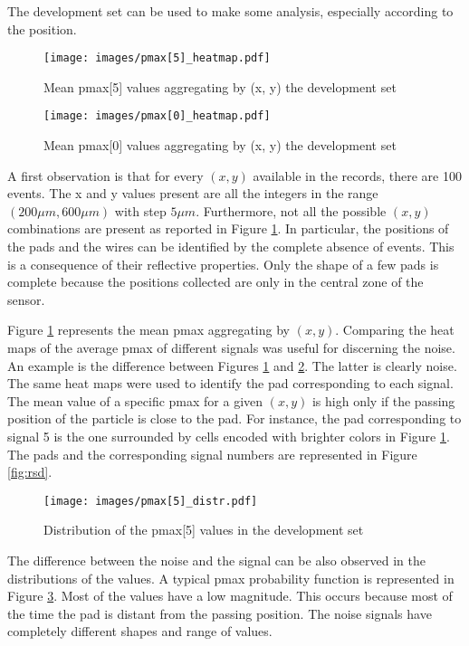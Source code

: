 \documentclass[conference]{IEEEtran}
\begin{document}
The development set can be used to make some analysis, especially according to the position.\\
\begin{figure}[htbp]
\centerline{\texttt{[image: images/pmax[5]\_heatmap.pdf]}}
\caption{Mean pmax[5] values aggregating by (x, y) the development set}
\label{fig:pmax[5]_heatmap}
\end{figure}
\begin{figure}[htbp]
\centerline{\texttt{[image: images/pmax[0]\_heatmap.pdf]}}
\caption{Mean pmax[0] values aggregating by (x, y) the development set}
\label{fig:pmax[0]_heatmap}
\end{figure}
A first observation is that for every $(x, y)$ available in the records, there are 100 events. The x and y values present are all the integers in the range $(200 \mu m, 600 \mu m)$ with step $5 \mu m$. Furthermore, not all the possible $(x, y)$ combinations are present as reported in Figure 
\ref{fig:pmax[5]_heatmap}. In particular, the positions of the pads and the wires can be identified by the complete absence of events. This is a consequence of their reflective properties. Only the shape of a few pads is complete because the positions collected are only in the central zone of the sensor. 

Figure \ref{fig:pmax[5]_heatmap} represents the mean pmax aggregating by $(x, y)$. Comparing the heat maps of the average pmax of different signals was useful for discerning the noise. An example is the difference between Figures \ref{fig:pmax[5]_heatmap} and \ref{fig:pmax[0]_heatmap}. The latter is clearly noise. \\
The same heat maps were used to identify the pad corresponding to each signal. The mean value of a specific pmax for a given $(x, y)$ is high only if the passing position of the particle is close to the pad. For instance, the pad corresponding to signal 5 is the one surrounded by cells encoded with brighter colors in Figure \ref{fig:pmax[5]_heatmap}.
The pads and the corresponding signal numbers are represented in Figure \ref{fig:rsd}.\\

\begin{figure}[htbp]
\centerline{\texttt{[image: images/pmax[5]\_distr.pdf]}}
\caption{Distribution of the pmax[5] values in the development set}
\label{fig:pmax[5]_distr}
\end{figure}
The difference between the noise and the signal can be also observed in the distributions of the values. A typical pmax probability function is represented in Figure \ref{fig:pmax[5]_distr}. Most of the values have a low magnitude. This occurs because most of the time the pad is distant from the passing position. The noise signals have completely different shapes and range of values. \\
\end{document}
